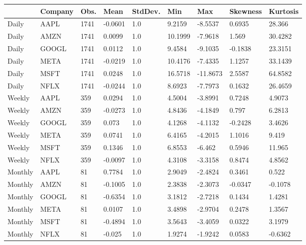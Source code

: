 \begin{tabular}{lllllllll}
\toprule
{} & Company &  Obs. &    Mean & StdDev. &      Min &      Max & Skewness & Kurtosis \\
\midrule
Daily   &    AAPL &  1741 & -0.0601 &     1.0 &   9.2159 &  -8.5537 &   0.6935 &   28.366 \\
Daily   &    AMZN &  1741 &  0.0099 &     1.0 &  10.1999 &  -7.9618 &    1.569 &  30.4282 \\
Daily   &   GOOGL &  1741 &  0.0112 &     1.0 &   9.4584 &  -9.1035 &  -0.1838 &  23.3151 \\
Daily   &    META &  1741 & -0.0219 &     1.0 &  10.4176 &  -7.4335 &   1.1257 &  33.1439 \\
Daily   &    MSFT &  1741 &  0.0248 &     1.0 &  16.5718 & -11.8673 &   2.5587 &  64.8582 \\
Daily   &    NFLX &  1741 & -0.0244 &     1.0 &   8.6923 &  -7.7973 &   0.1632 &  26.4659 \\
Weekly  &    AAPL &   359 &  0.0294 &     1.0 &   4.5004 &  -3.8991 &   0.7248 &   4.9073 \\
Weekly  &    AMZN &   359 & -0.0273 &     1.0 &   4.8436 &  -4.1849 &    0.797 &   6.2813 \\
Weekly  &   GOOGL &   359 &   0.073 &     1.0 &   4.1268 &  -4.1132 &  -0.2428 &   3.4626 \\
Weekly  &    META &   359 &  0.0741 &     1.0 &   6.4165 &  -4.2015 &   1.1016 &    9.419 \\
Weekly  &    MSFT &   359 &  0.1346 &     1.0 &   6.8553 &   -6.462 &   0.5946 &   11.965 \\
Weekly  &    NFLX &   359 & -0.0097 &     1.0 &   4.3108 &  -3.3158 &   0.8474 &   4.8562 \\
Monthly &    AAPL &    81 &  0.7784 &     1.0 &   2.9049 &  -2.4824 &   0.3461 &    0.522 \\
Monthly &    AMZN &    81 & -0.1005 &     1.0 &   2.3838 &  -2.3073 &  -0.0347 &  -0.1078 \\
Monthly &   GOOGL &    81 & -0.6354 &     1.0 &   3.1812 &  -2.7218 &   0.1434 &   1.4281 \\
Monthly &    META &    81 &  0.0107 &     1.0 &   3.4898 &  -2.9704 &   0.2478 &   1.3567 \\
Monthly &    MSFT &    81 & -0.4894 &     1.0 &   3.5643 &  -3.4059 &   0.0322 &   3.1979 \\
Monthly &    NFLX &    81 &  -0.025 &     1.0 &   1.9274 &  -1.9242 &   0.0583 &  -0.6362 \\
\bottomrule
\end{tabular}
